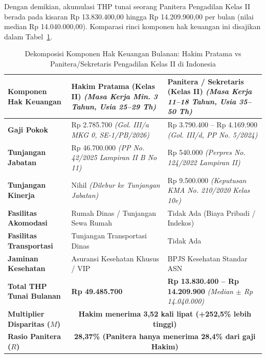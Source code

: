 \documentclass[12pt, a4paper]{article}
\begin{document}
Dengan demikian, akumulasi THP tunai seorang Panitera Pengadilan Kelas II berada pada kisaran Rp 13.830.400,00 hingga Rp 14.209.900,00 per bulan (nilai median Rp 14.040.000,00). Komparasi rinci komponen hak keuangan ini disajikan dalam Tabel~\ref{tab:komparasi-thp-indonesia}.

\begin{table}[H]
\centering
\fontsize{9}{11}\selectfont
\caption{Dekomposisi Komponen Hak Keuangan Bulanan: Hakim Pratama vs Panitera/Sekretaris Pengadilan Kelas II di Indonesia}
\label{tab:komparasi-thp-indonesia}
\renewcommand{\arraystretch}{1.35}
\begin{tabular}{p{4.0cm} p{5.2cm} p{5.2cm}}
\hline
\textbf{Komponen Hak Keuangan} & \textbf{Hakim Pratama (Kelas II)} \newline \textit{(Masa Kerja Min. 3 Tahun, Usia 25--29 Th)} & \textbf{Panitera / Sekretaris (Kelas II)} \newline \textit{(Masa Kerja 11--18 Tahun, Usia 35--50 Th)} \tabularnewline
\hline
\raggedright\textbf{Gaji Pokok} & \raggedright Rp 2.785.700 \newline \textit{(Gol. III/a MKG 0, SE-1/PB/2026)} & \raggedright Rp 3.790.400 -- Rp 4.169.900 \newline \textit{(Gol. III/d, PP No. 5/2024)} \tabularnewline
\raggedright\textbf{Tunjangan Jabatan} & \raggedright Rp 46.700.000 \newline \textit{(PP No. 42/2025 Lampiran II B No 11)} & \raggedright Rp 540.000 \newline \textit{(Perpres No. 124/2022 Lampiran II)} \tabularnewline
\raggedright\textbf{Tunjangan Kinerja} & \raggedright Nihil \textit{(Dilebur ke Tunjangan Jabatan)} & \raggedright Rp 9.500.000 \newline \textit{(Keputusan KMA No. 210/2020 Kelas 10e)} \tabularnewline
\raggedright\textbf{Fasilitas Akomodasi} & \raggedright Rumah Dinas / Tunjangan Sewa Rumah & \raggedright Tidak Ada (Biaya Pribadi / Indekos) \tabularnewline
\raggedright\textbf{Fasilitas Transportasi} & \raggedright Tunjangan Transportasi Dinas & \raggedright Tidak Ada \tabularnewline
\raggedright\textbf{Jaminan Kesehatan} & \raggedright Asuransi Kesehatan Khusus / VIP & \raggedright BPJS Kesehatan Standar ASN \tabularnewline
\hline
\raggedright\textbf{Total THP Tunai Bulanan} & \raggedright \textbf{Rp 49.485.700} & \raggedright \textbf{Rp 13.830.400 -- Rp 14.209.900} \newline \textit{(Median $\pm$ Rp 14.040.000)} \tabularnewline
\hline
\raggedright\textbf{Multiplier Disparitas ($M$)} & \multicolumn{2}{c}{\textbf{Hakim menerima 3,52 kali lipat (+252,5\% lebih tinggi)}} \tabularnewline
\raggedright\textbf{Rasio Panitera ($R$)} & \multicolumn{2}{c}{\textbf{28,37\% (Panitera hanya menerima 28,4\% dari gaji Hakim)}} \tabularnewline
\hline
\end{tabular}
\end{table}
\end{document}
